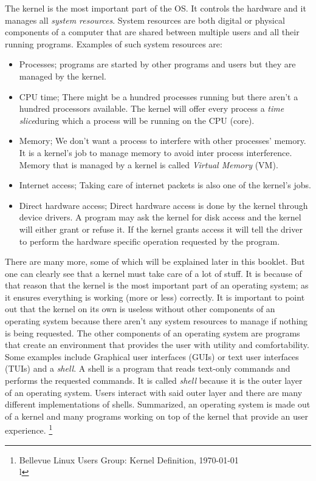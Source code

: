 The kernel is the most important part of the OS. It controls the hardware and it
manages all \textit{system resources}. System resources are both digital or physical
components of a computer that are shared between multiple users and all their
running programs. Examples of such system resources are:
\begin{itemize}
\item Processes; programs are started by other programs and users but they are managed by the kernel.
\item CPU time; There might be a hundred processes running but there aren't a hundred processors available. The kernel will offer every process a \textit{time slice}during which a process will be running on the CPU (core).
\item Memory; We don't want a process to interfere with other processes' memory. It is a kernel's job to manage memory to avoid inter process interference. Memory that is managed by a kernel is called \textit{Virtual Memory} (VM).
\item Internet access; Taking care of internet packets is also one of the kernel's jobs.
\item Direct hardware access; Direct hardware access is done by the kernel through device drivers. A program may ask the kernel for disk access and the kernel will either grant or refuse it. If the kernel grants access it will tell the driver to perform the hardware specific operation requested by the program.
\end{itemize}
There are many more, some of which will be explained later in this booklet.
But one can clearly see that a kernel must take care of a lot of stuff. It
is because of that reason that the kernel is the most important part of an
operating system; as it ensures everything is working (more or less)
correctly. It is important to point out that the kernel on its own is useless
without other components of an operating system because there aren't any
system resources to manage if nothing is being requested.
The other components of an
operating system are programs that create an environment that provides the user with
utility and comfortability. Some examples include Graphical user interfaces (GUIs) 
or text user interfaces (TUIs) and a \textit{shell}. A shell is a
program that reads text-only commands and performs the requested commands. It
is called \textit{shell} because it is the outer layer of an operating system. Users
interact with said outer layer and there are many different implementations
of shells. Summarized, an operating system is made out of a kernel and many programs working on top of the kernel that provide an user experience. \footnote{Bellevue Linux Users Group: Kernel Definition, \today \\l}


